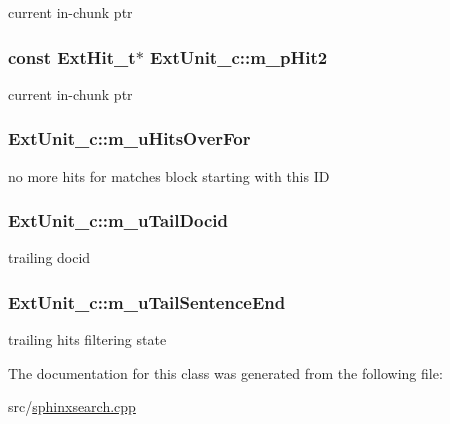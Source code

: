 current in-\/chunk ptr 

\hypertarget{classExtUnit__c_a6ac8ef18eab790394e8af423486d0bf4}{
\subsubsection[{m\-\_\-p\-Hit2}]{\setlength{\rightskip}{0pt plus 5cm}const {\bf Ext\-Hit\-\_\-t}$\ast$ Ext\-Unit\-\_\-c\-::m\-\_\-p\-Hit2\hspace{0.3cm}{\ttfamily [private]}}}\label{classExtUnit__c_a6ac8ef18eab790394e8af423486d0bf4}


current in-\/chunk ptr 

\hypertarget{classExtUnit__c_a329f5cee71887a7e7a8188385089ac54}{
\subsubsection[{m\-\_\-u\-Hits\-Over\-For}]{ Ext\-Unit\-\_\-c\-::m\-\_\-u\-Hits\-Over\-For\hspace{0.3cm}{\ttfamily [private]}}}\label{classExtUnit__c_a329f5cee71887a7e7a8188385089ac54}


no more hits for matches block starting with this I\-D 

\hypertarget{classExtUnit__c_a92ee25f0d59bf056fffc60bb225cb039}{
\subsubsection[{m\-\_\-u\-Tail\-Docid}]{ Ext\-Unit\-\_\-c\-::m\-\_\-u\-Tail\-Docid\hspace{0.3cm}{\ttfamily [private]}}}\label{classExtUnit__c_a92ee25f0d59bf056fffc60bb225cb039}


trailing docid 

\hypertarget{classExtUnit__c_aa7d3a2f432459a55c62e9d8e7ccbe06a}{
\subsubsection[{m\-\_\-u\-Tail\-Sentence\-End}]{ Ext\-Unit\-\_\-c\-::m\-\_\-u\-Tail\-Sentence\-End\hspace{0.3cm}{\ttfamily [private]}}}\label{classExtUnit__c_aa7d3a2f432459a55c62e9d8e7ccbe06a}


trailing hits filtering state 



The documentation for this class was generated from the following file\-:\begin{DoxyCompactItemize}
\item 
src/\hyperlink{sphinxsearch_8cpp}{sphinxsearch.\-cpp}\end{DoxyCompactItemize}

